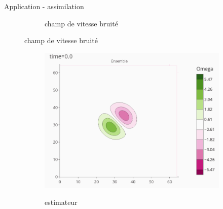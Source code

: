 \documentclass[aspectratio=169]{beamer} %
\begin{document}
\begin{frame}{Application - assimilation}
\begin{figure}[t]
\begin{subfigure}{0.3\textwidth}
            \caption*{\tiny champ de vitesse bruité}
        \end{subfigure}
    \end{figure}
    \begin{figure}[t]
        \begin{subfigure}{0.3\textwidth}
            \centering
            {\includegraphics[height=0.3\textheight]{../../conference/images/dipole_estimate/estimate/estimate-0.png}}
            \caption*{\tiny estimateur}
        \end{subfigure}
        \begin{subfigure}{0.3\textwidth}
            \centering

\end{subfigure}
\end{figure}
\end{frame}
\end{document}
